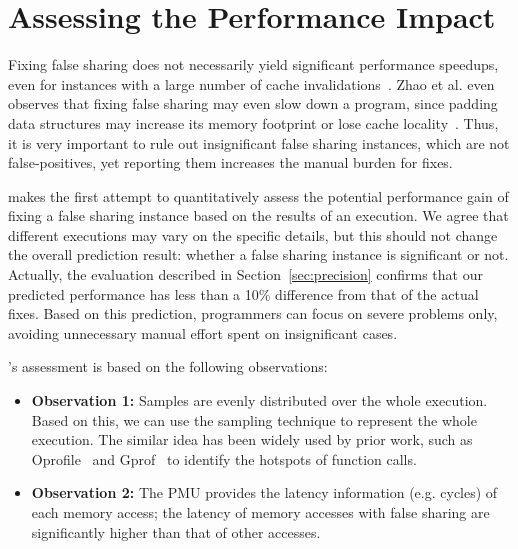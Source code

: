 \section{Assessing the Performance Impact}

\label{sec:predictimprove}
Fixing false sharing does not necessarily yield significant performance speedups, even for instances with a large number of cache invalidations~\cite{Sheriff, Predator}. Zhao et al. even observes that fixing false sharing may even slow down a program, since padding data structures may increase its memory footprint or lose cache locality~\cite{qinzhao}. Thus, it is very important to rule out insignificant false sharing instances, which are not false-positives, yet reporting them increases the manual burden for fixes.

\cheetah{} makes the first attempt to quantitatively assess the potential performance gain of fixing a false sharing instance based on the results of an execution. We agree that different executions may vary on the specific details, but this should not change the overall prediction result: whether a false sharing instance is significant or not. Actually, the evaluation described in Section~\ref{sec:precision} confirms that our predicted performance has less than a 10\% difference from that of the actual fixes. Based on this prediction, programmers can focus on severe problems only, avoiding unnecessary manual effort spent on insignificant cases.

\cheetah{}'s assessment is based on the following observations:

\begin{itemize}
\item {\bf Observation 1:} Samples are evenly distributed over the whole execution. Based on this, we can use the sampling technique to represent the whole execution. The similar idea has been widely used by prior work, such as Oprofile~\cite{oprofile} and Gprof~\cite{DBLP:conf/sigplan/GrahamKM82} to identify the hotspots of function calls.

\item {\bf Observation 2:} The PMU provides the latency information (e.g. cycles) of each memory access; the latency of memory accesses with false sharing are significantly higher than that of other accesses. 

\end{itemize}

